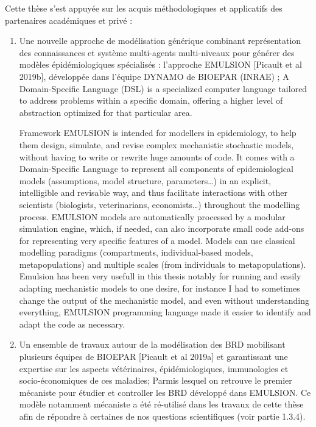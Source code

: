 Cette thèse s'est appuyée sur les acquis méthodologiques et applicatifs des partenaires académiques et privé :
\begin{enumerate}
    \item Une nouvelle approche de modélisation générique combinant représentation des connaissances et système multi-agents multi-niveaux pour générer des modèles épidémiologiques spécialisés : l’approche EMULSION [Picault et al 2019b], développée dans l’équipe DYNAMO de BIOEPAR (INRAE) ; A Domain-Specific Language (DSL) is a specialized computer language tailored to address problems within a specific domain, offering a higher level of abstraction optimized for that particular area.  
    
    Framework EMULSION is intended for modellers in epidemiology, to help them design, simulate, and revise complex mechanistic stochastic models, without having to write or rewrite huge amounts of code. It comes with a Domain-Specific Language to represent all components of epidemiological models (assumptions, model structure, parameters…) in an explicit, intelligible and revisable way, and thus facilitate interactions with other scientists (biologists, veterinarians, economists…) throughout the modelling process. EMULSION models are automatically processed by a modular simulation engine, which, if needed, can also incorporate small code add-ons for representing very specific features of a model. Models can use classical modelling paradigms (compartments, individual-based models, metapopulations) and multiple scales (from individuals to metapopulations). Emulsion has been very usefull in this thesis notably for running and easily adapting mechanistic models to one desire, for instance I had to sometimes change the output of the mechanistic model, and even without understanding everything, EMULSION programming language made it easier to identify and adapt the code as necessary.

    \item Un ensemble de travaux autour de la modélisation des BRD mobilisant plusieurs équipes de BIOEPAR [Picault et al 2019a] et garantissant une expertise sur les aspects vétérinaires, épidémiologiques, immunologies et socio-économiques de ces maladies; Parmis lesquel on retrouve le premier mécaniste  pour étudier et controller les BRD développé dans EMULSION. Ce modèle notamment mécaniste a été ré-utilisé dans les travaux de cette thèse afin de répondre à certaines de nos questions scientifiques (voir partie 1.3.4).


\end{enumerate}
